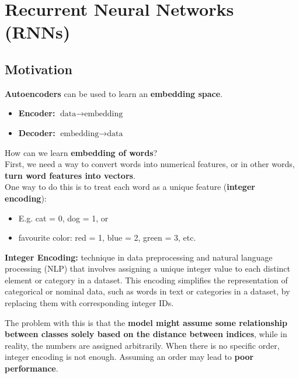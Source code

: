 \chapter{Recurrent Neural Networks (RNNs)}
\section{Motivation}

\textbf{Autoencoders} can be used to learn an \textbf{embedding space}.
\begin{itemize}
  \item \textbf{Encoder:}
\(\text{data} \rightarrow \text{embedding}\)
  
  \item \textbf{Decoder:}
\(\text{embedding} \rightarrow \text{data}\)

\end{itemize}

How can we learn \textbf{embedding of words}?\\

\noindent First, we need a way to convert words into numerical features, or in other words, \textbf{turn word features into vectors}. \\

One way to do this is to treat each word as a unique feature (\textbf{integer encoding}):
\begin{itemize}
    \item E.g. cat = 0, dog = 1, or
    \item favourite color: red = 1, blue = 2, green = 3, etc.
\end{itemize}

\begin{definition}
\textbf{Integer Encoding:} technique in data preprocessing and natural language processing (NLP) that involves assigning a unique integer value to each distinct element or category in a dataset. This encoding simplifies the representation of categorical or nominal data, such as words in text or categories in a dataset, by replacing them with corresponding integer IDs.
\end{definition}

The problem with this is that the \textbf{model might assume some relationship between classes solely based on the distance between indices}, while in reality, the numbers are assigned arbitrarily. When there is no specific order, integer encoding is not enough. Assuming an order may lead to \textbf{poor performance}. \\

